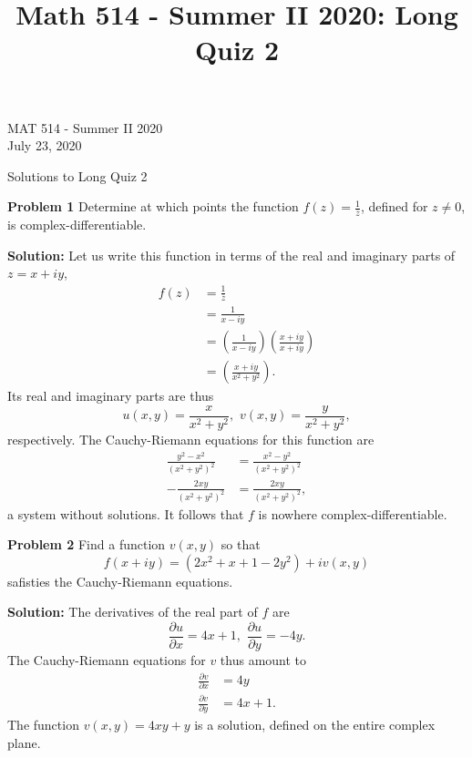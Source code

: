 \documentclass[12pt,oneside]{exam}
\title{Math 514 - Summer II 2020: Long Quiz 2}
\newenvironment{exercise}[1]{\vspace{.1in}\noindent\textbf{Problem #1 \hspace{.05em}}}{}
\begin{document}
\begin{flushright}
\sc MAT 514 - Summer II 2020\\
July 23, 2020
\end{flushright}
\bigskip
 
\begin{center}
\textsf{Solutions to Long Quiz 2} 
\end{center}


\begin{exercise}{1}
Determine at which points the function $f(z)=\frac{1}{\overline{z}}$, defined for $z\neq 0$, is complex-differentiable. 
\end{exercise}
\vspace{0.5cm}

\noindent\textbf{Solution:} Let us write this function in terms of the real and imaginary parts of $z= x+iy$, 
\begin{align*}
f(z) & = \frac{1}{\overline{z}} \\
& = \frac{1}{x-iy}\\
& = \left(\frac{1}{x-iy}\right)\left(\frac{x+iy}{x+iy}\right) \\
& = \left(\frac{x+iy}{x^2+y^2}\right).
\end{align*}
Its real and imaginary parts are thus 
\begin{equation*}
u(x,y) = \frac{x}{x^2+y^2}, \, \, v(x,y) = \frac{y}{x^2+y^2},
\end{equation*}
respectively. The Cauchy-Riemann equations for this function are
\begin{align*}
\frac{y^2-x^2}{(x^2+y^2)^2} & = \frac{x^2-y^2}{(x^2+y^2)^2} \\
-\frac{2xy}{(x^2+y^2)^2} & = \frac{2xy}{(x^2+y^2)^2},
\end{align*}
a system without solutions. It follows that $f$ is nowhere complex-differentiable.

\vspace{1cm}

\begin{exercise}{2}
Find a function $v(x,y)$ so that 
\begin{equation*}
f(x+iy) = (2x^2+x+1-2y^2) + iv(x,y)
\end{equation*}
safisties the Cauchy-Riemann equations.
\end{exercise}

\vspace{0.5cm}

\noindent \textbf{Solution:} The derivatives of the real part of $f$ are 
\begin{equation*}
\frac{\partial u}{\partial x} = 4x+1, \, \, \frac{\partial u}{\partial y} = -4y.
\end{equation*}
The Cauchy-Riemann equations for $v$ thus amount to 
\begin{align*}
\frac{\partial v}{\partial x} & = 4y \\
\frac{\partial v}{\partial y	} & = 4x+1.
\end{align*}
The function $v(x,y)=4xy+y$ is a solution, defined on the entire complex plane. 
\end{document}
